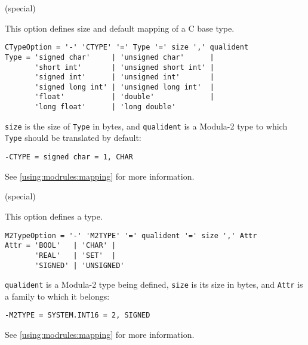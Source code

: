 \ifonline \else
\begin{description}
\fi

 (special)

This option defines size and default mapping of a C base type.

\begin{verbatim}
CTypeOption = '-' 'CTYPE' '=' Type '=' size ',' qualident
Type = 'signed char'     | 'unsigned char'      |
       'short int'       | 'unsigned short int' |
       'signed int'      | 'unsigned int'       |
       'signed long int' | 'unsigned long int'  |
       'float'           | 'double'             |
       'long float'      | 'long double'
\end{verbatim}

\verb'size' is the size of \verb'Type' in bytes, and \verb'qualident' is
a Modula-2 type to which \verb'Type' should be translated by default:

\verb'-CTYPE = signed char = 1, CHAR'

See \ref{using:modrules:mapping} for more information.

 (special)

This option defines a \mt{} type.

\begin{verbatim}
M2TypeOption = '-' 'M2TYPE' '=' qualident '=' size ',' Attr
Attr = 'BOOL'   | 'CHAR' |
       'REAL'   | 'SET'  |
       'SIGNED' | 'UNSIGNED'
\end{verbatim}

\verb'qualident' is a Modula-2 type being defined, \verb'size'
is its size in bytes, and \verb'Attr' is a family to which it belongs:

\verb'-M2TYPE = SYSTEM.INT16 = 2, SIGNED'

See \ref{using:modrules:mapping} for more information.

\ifonline \else
\end{description}
\fi


